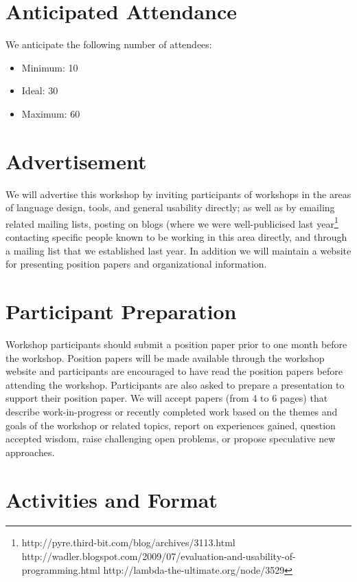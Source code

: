\documentclass{sigplanconf}
\begin{document}
\section{Anticipated Attendance}

We anticipate the following number of attendees:

\begin{itemize}
\item Minimum: 10 
\item Ideal: 30
\item Maximum: 60 
\end{itemize}

\section{Advertisement}

We will advertise this workshop by inviting participants of workshops
in the areas of language design, tools, and general usability
directly; as well as by emailing related mailing lists, posting on
blogs (where we were well-publicised last
year\footnote{http://pyre.third-bit.com/blog/archives/3113.html
http://wadler.blogspot.com/2009/07/evaluation-and-usability-of-programming.html
http://lambda-the-ultimate.org/node/3529}
contacting specific people known to be working in this area directly,
and through a mailing list that we established last year. In
addition we will maintain a website for presenting position papers and organizational
information.

\section{Participant Preparation}

Workshop participants should submit a position paper prior to one
month before the workshop. Position papers will be made available
through the workshop website and participants are encouraged to have
read the position papers before attending the workshop. Participants
are also asked to prepare a presentation to support their position
paper. We will accept papers (from 4 to 6 pages) that describe
work-in-progress or recently completed work based on the themes and
goals of the workshop or related topics, report on experiences gained,
question accepted wisdom, raise challenging open problems, or propose
speculative new approaches.

\section{Activities and Format}
\end{document}

